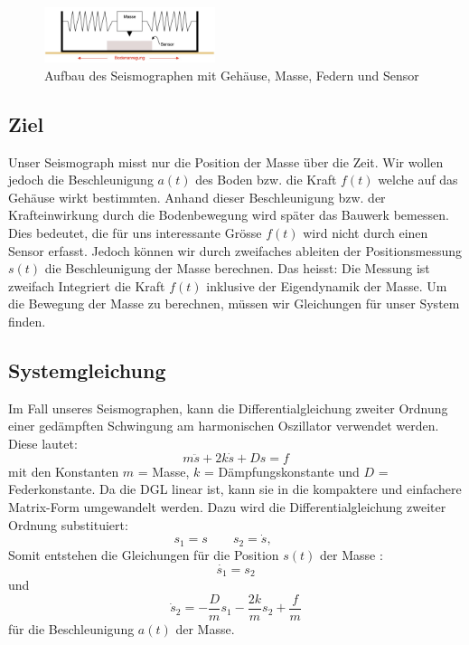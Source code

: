 \begin{figure}
 \begin{center}
 \includegraphics[width=5cm]{papers/erdbeben/Apperatur}
 \caption{Aufbau des Seismographen mit Gehäuse, Masse, Federn und Sensor}
 \end{center}
\end{figure}

\subsection{Ziel}
Unser Seismograph misst nur die Position der Masse über die Zeit. 
Wir wollen jedoch die Beschleunigung $a(t)$ des Boden bzw. die Kraft $f(t)$ welche auf das Gehäuse wirkt bestimmten.  
Anhand dieser Beschleunigung bzw. der Krafteinwirkung durch die Bodenbewegung wird später das Bauwerk bemessen.
Dies bedeutet, die für uns interessante Grösse $f(t)$ wird nicht durch einen Sensor erfasst. 
Jedoch können wir durch zweifaches ableiten der Positionsmessung $s(t)$ die Beschleunigung der Masse berechnen. 
Das heisst: Die Messung ist zweifach Integriert die Kraft $f(t)$ inklusive der Eigendynamik der Masse.
Um die Bewegung der Masse zu berechnen, müssen wir Gleichungen für unser System finden.

\subsection{Systemgleichung}
Im Fall unseres Seismographen, kann die Differentialgleichung zweiter Ordnung einer gedämpften Schwingung am harmonischen Oszillator verwendet werden. 
Diese lautet:
\begin{equation}
m\ddot s + 2k \dot s + Ds = f
\end{equation}
mit den Konstanten $m$ = Masse, $k$ = Dämpfungskonstante und $D$  = Federkonstante.
Da die DGL linear ist, kann sie in die kompaktere und einfachere Matrix-Form umgewandelt werden. Dazu wird die Differentialgleichung zweiter Ordnung substituiert:
\[ {s_1}=s \qquad
{s_2}=\dot s,  \qquad\]
Somit entstehen die Gleichungen für die Position $s(t)$ der Masse :
\[ \dot {s_1} = {s_2}\] 
und
\[ \dot s_2 = -\frac{D}{m} {s_1} -\frac{2k}{m} {s_2} + \frac{f} {m} \] für die Beschleunigung $a(t)$ der Masse.


